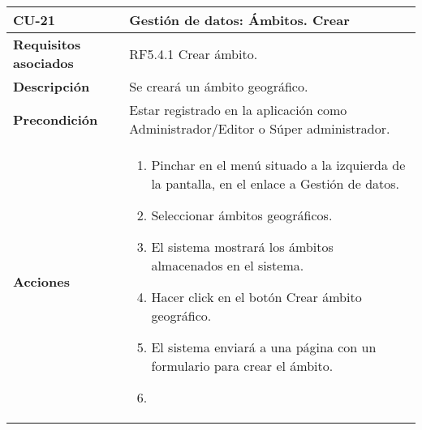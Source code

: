 \begin{longtable}[H]{@{}ll@{}}
\toprule
\begin{minipage}[b]{0.23\columnwidth}\raggedright\strut
\textbf{CU-21}\strut
\end{minipage} & \begin{minipage}[b]{0.71\columnwidth}\raggedright\strut
\textbf{Gestión de datos: Ámbitos. Crear}\strut
\end{minipage}\tabularnewline
\midrule
\endhead
\begin{minipage}[t]{0.23\columnwidth}\raggedright\strut
\textbf{Requisitos asociados}\strut
\end{minipage} & \begin{minipage}[t]{0.71\columnwidth}\raggedright\strut
RF5.4.1 Crear ámbito.\strut
\end{minipage}\tabularnewline
\begin{minipage}[t]{0.23\columnwidth}\raggedright\strut
\textbf{Descripción}\strut
\end{minipage} & \begin{minipage}[t]{0.71\columnwidth}\raggedright\strut
Se creará un ámbito geográfico.
\strut
\end{minipage}\tabularnewline
\begin{minipage}[t]{0.23\columnwidth}\raggedright\strut
\textbf{Precondición}\strut
\end{minipage} & \begin{minipage}[t]{0.71\columnwidth}\raggedright\strut
Estar registrado en la aplicación como Administrador/Editor o Súper administrador.\strut
\end{minipage}\tabularnewline
\begin{minipage}[t]{0.23\columnwidth}\raggedright\strut
\textbf{Acciones}\strut
\end{minipage} & \begin{minipage}[t]{0.71\columnwidth}\raggedright\strut
\begin{enumerate}
\def\labelenumi{\arabic{enumi}.}
\tightlist
\item
Pinchar en el menú situado a la izquierda de la pantalla, en el
enlace a Gestión de datos.
\item
Seleccionar ámbitos geográficos.
\item
El sistema mostrará los ámbitos almacenados en el sistema.
\item
Hacer click en el botón Crear ámbito geográfico.
\item
El sistema enviará a una página con un formulario para crear el ámbito.
\item

\end{enumerate}
\end{minipage}
\end{longtable}
